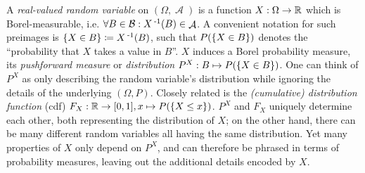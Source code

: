 \documentclass[a4paper]{scrreprt}
\DeclareMathOperator{\A}{\mathcal{A}}
\newcommand{\Rp}{\mathbb{R}_{\geq 0}}
\newcommand{\B}{\mathcal{B}}
\begin{document}
    A \emph{real-valued random variable} on $(\Omega, \A)$ is a function $X: \Omega \to \mathbb{R}$ which is Borel-measurable, i.e. $\forall B \in \B: X\inv(B) \in \A$. 
    A convenient notation for such preimages is $\{X \in B\} \coloneqq X\operatorname{^{-1}}(B)$, such that $P(\{X \in B\})$ denotes the “probability that $X$ takes a value in $B$”.
    $X$ induces a Borel probability measure, its \emph{pushforward measure} or \emph{distribution} $P^X: B \mapsto P(\{X \in B\})$. One can think of $P^X$ as only describing the random variable's distribution while ignoring the details of the underlying $(\Omega, P)$.
    Closely related is the \emph{(cumulative) distribution function} (cdf) $F_X: \mathbb{R} \to [0, 1], x \mapsto P(\{X \leq x\})$.
    $P^X$ and $F_X$ uniquely determine each other, both representing the distribution of $X$; on the other hand, there can be many different random variables all having the same distribution.
    Yet many properties of $X$ only depend on $P^X$, and can therefore be phrased in terms of probability measures, leaving out the additional details encoded by $X$.
    
    
\end{document}
